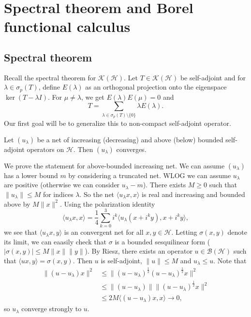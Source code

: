 \section{Spectral theorem and Borel functional calculus}

\subsection{Spectral theorem}

Recall the spectral theorem for $\mathcal{K(\mathcal{H})}$.
Let $T \in \mathcal{K} (\mathcal{H})$ be self-adjoint and for $\lambda \in \sigma_p (T)$, define $E(\lambda)$
as an orthogonal projection onto the eigenspace $\ker (T - \lambda I)$.
For $\mu \neq \lambda$, we get $E(\lambda) E(\mu) = 0$ and 
$$T = \sum_{\lambda \in \sigma_p (T) \setminus \{0\}} \lambda E(\lambda).$$
Our first goal will be to generalize this to non-compact self-adjoint operator.

\begin{theorem}[Vigier]
  Let $(u_\lambda)$ be a net of increasing (decreasing) and above (below) bounded self-adjoint operators on $\mathcal{H}$.
  Then $(u_\lambda)$ converges.
\end{theorem}

\begin{myproof}
  We prove the statement for above-bounded increasing net. We can assume $(u_\lambda)$ has a lower bound $m$ by considering a truncated net. 
  WLOG we can assume $u_\lambda$ are positive (otherwise we can consider $u_\lambda - m$).
  There exists $M \geq 0$ such that $\|u_\lambda\| \leq M$ for indices $\lambda$. So the net $\langle u_\lambda x, x\rangle$
  is real and increasing and bounded above by $M \|x\|^2$. Using the polarization identity 
  $$\langle u_\lambda x, x\rangle = \frac{1}{4} \sum_{k = 0} ^3 i^k \langle u_\lambda (x + i^k y), x + i^k y\rangle,$$
  we see that $\langle u_\lambda x, y\rangle$ is an convergent net for all $x, y \in \mathcal{H}$.
  Letting $\sigma(x, y)$ denote its limit, we can eaasily check that $\sigma$ is a bounded sesquilinear form ($|\sigma(x, y)| \leq M\|x\| \|y\|$).
  By Riesz, there exists an operator $u \in \mathcal{B} (\mathcal{H})$ such that $\langle ux, y\rangle = \sigma(x, y)$.
  Then $u$ is self-adjoint, $\|u\| \leq M$ and $u_\lambda \leq u$. Note that 
  \begin{align*}
    \| (u - u_\lambda)x\|^2 &\leq \| (u - u_\lambda)^{\frac{1}{2}} (u - u_\lambda)^{\frac{1}{2}} x \|^2\\
    &\leq \| (u - u_\lambda) \| \| (u - u_\lambda)^{\frac{1}{2}} x\|^2\\
    &\leq 2M \langle (u - u_\lambda)x, x\rangle \to 0,
  \end{align*}
  so $u_\lambda$ converge strongly to $u$.
\end{myproof}

